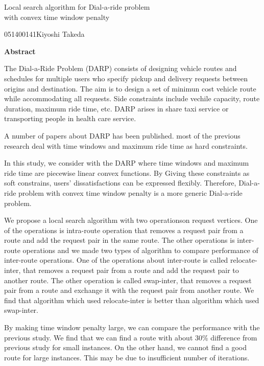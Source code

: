

\newpage
\begin{center}{\LARGE Local  search algorithm for Dial-a-ride problem\\ with convex time window penalty}\\[0.5cm]
\end{center}
\hfill {\large 051400141\qquad Kiyoshi Takeda}\\[0.5cm]
\begin{center}
{\large \bf Abstract}\\
\end{center}
The Dial-a-Ride Problem (DARP) consists of designing vehicle routes and schedules for multiple users who specify pickup and delivery requests between origins and destination. The aim is to design a set of minimun cost vehicle route while accommodating all requests. Side constraints include vechile capacity, route duration, maximum ride time, etc. DARP arises in share taxi service or transporting people in health care service.

A number of papers about DARP has been published. most of the previous research deal with time windows and maximum ride time as hard constraints.

In this study, we consider with the DARP where time windows and maximum ride time are piecewise linear convex functions. By Giving these constraints as soft constrains, users' dissatisfactions can be expressed flexibly. Therefore, Dial-a-ride problem with convex time window penalty is a more generic Dial-a-ride problem.

We propose a local search algorithm with two operationson request vertices. One of the operations is intra-route operation that removes a request pair from a route and add the request pair in the same route. The other operations is inter-route operations and we made two types of algorithm to compare performance of inter-route operations.
One of the operations about inter-route is called relocate-inter, that removes a request pair from a route and add the request pair to another route. The other operation is called swap-inter, that removes a request pair from a route and exchange it with the request pair from another route.
We find that algorithm which used relocate-inter is better than algorithm which used swap-inter.

By making time window penalty large, we can compare the performance with the previous study. We find that we can find a route with about 30\% difference from previous study for small instances. On the other hand, we cannot find a good route for large instances. This may be due to insufficient number of iterations.


